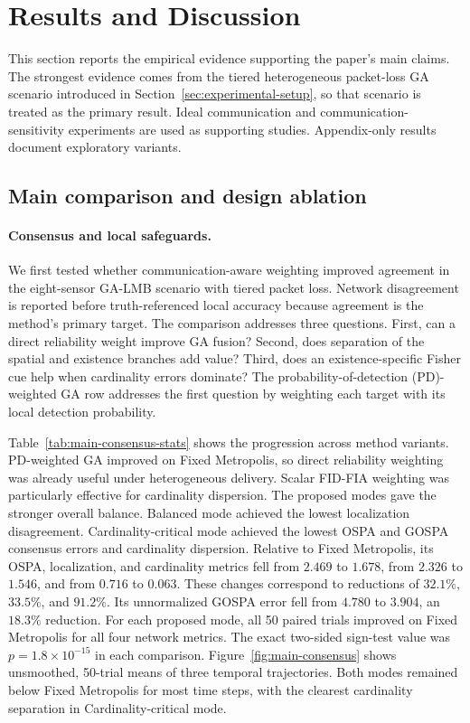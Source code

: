 \section{Results and Discussion}
\label{sec:results}

This section reports the empirical evidence supporting the paper's main claims. The strongest evidence comes from the tiered heterogeneous packet-loss GA scenario introduced in Section~\ref{sec:experimental-setup}, so that scenario is treated as the primary result. Ideal communication and communication-sensitivity experiments are used as supporting studies. Appendix-only results document exploratory variants.

\subsection{Main comparison and design ablation}

\paragraph{Consensus and local safeguards.}
We first tested whether communication-aware weighting improved agreement in the eight-sensor GA-LMB scenario with tiered packet loss. Network disagreement is reported before truth-referenced local accuracy because agreement is the method's primary target. The comparison addresses three questions. First, can a direct reliability weight improve GA fusion? Second, does separation of the spatial and existence branches add value? Third, does an existence-specific Fisher cue help when cardinality errors dominate? The probability-of-detection (PD)-weighted GA row addresses the first question by weighting each target with its local detection probability.

Table~\ref{tab:main-consensus-stats} shows the progression across method variants. PD-weighted GA improved on Fixed Metropolis, so direct reliability weighting was already useful under heterogeneous delivery. Scalar FID-FIA weighting was particularly effective for cardinality dispersion. The proposed modes gave the stronger overall balance. Balanced mode achieved the lowest localization disagreement. Cardinality-critical mode achieved the lowest OSPA and GOSPA consensus errors and cardinality dispersion. Relative to Fixed Metropolis, its OSPA, localization, and cardinality metrics fell from $2.469$ to $1.678$, from $2.326$ to $1.546$, and from $0.716$ to $0.063$. These changes correspond to reductions of $32.1\%$, $33.5\%$, and $91.2\%$. Its unnormalized GOSPA error fell from $4.780$ to $3.904$, an $18.3\%$ reduction. For each proposed mode, all 50 paired trials improved on Fixed Metropolis for all four network metrics. The exact two-sided sign-test value was $p=1.8\times10^{-15}$ in each comparison. Figure~\ref{fig:main-consensus} shows unsmoothed, 50-trial means of three temporal trajectories. Both modes remained below Fixed Metropolis for most time steps, with the clearest cardinality separation in Cardinality-critical mode.

